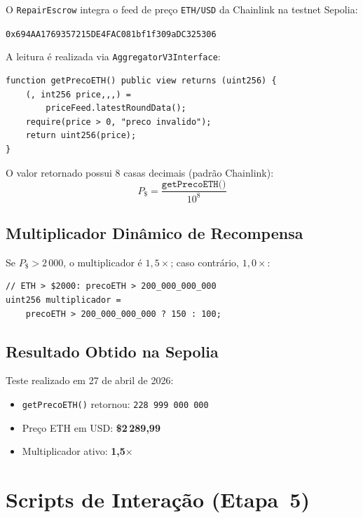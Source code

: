 \documentclass[
    12pt,
    a4paper,
    oneside,
    brazil,
    sumario=tradicional
]{abntex2}
\begin{document}
O \texttt{RepairEscrow} integra o feed de preço \texttt{ETH/USD} da
Chainlink na testnet Sepolia:

\begin{center}
\small\texttt{0x694AA1769357215DE4FAC081bf1f309aDC325306}
\end{center}

A leitura \'e realizada via \texttt{AggregatorV3Interface}:

\begin{lstlisting}[language=Solidity, caption={Leitura do or\'aculo}]
function getPrecoETH() public view returns (uint256) {
    (, int256 price,,,) =
        priceFeed.latestRoundData();
    require(price > 0, "preco invalido");
    return uint256(price);
}
\end{lstlisting}

O valor retornado possui 8 casas decimais (padrão Chainlink):
$$P_{\$} = \frac{\texttt{getPrecoETH()}}{10^8}$$

\subsection{Multiplicador Dinâmico de Recompensa}

Se $P_{\$} > 2\,000$, o multiplicador é $1{,}5\times$; caso contrário,
$1{,}0\times$:

\begin{lstlisting}[language=Solidity, caption={L\'ogica do multiplicador}]
// ETH > $2000: precoETH > 200_000_000_000
uint256 multiplicador =
    precoETH > 200_000_000_000 ? 150 : 100;
\end{lstlisting}

\subsection{Resultado Obtido na Sepolia}

Teste realizado em 27 de abril de 2026:
\begin{itemize}
    \item \texttt{getPrecoETH()} retornou: \texttt{228\,999\,000\,000}
    \item Preço ETH em USD: \textbf{\$2\,289,99}
    \item Multiplicador ativo: \textbf{1,5$\times$}
\end{itemize}

\section{Scripts de Interação (Etapa~5)}
\end{document}
